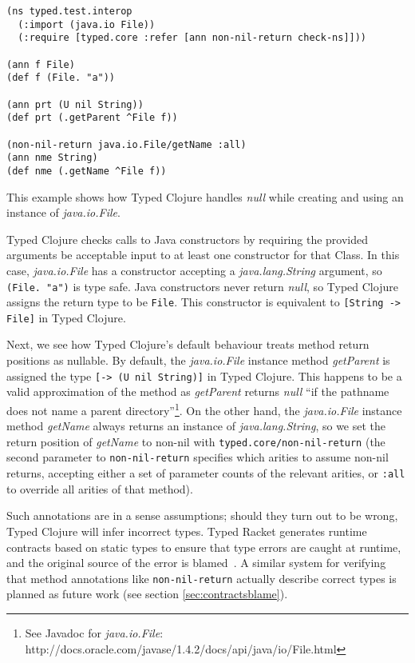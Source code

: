 \begin{lstlisting}[caption=Java interoperability with Typed Clojure]
(ns typed.test.interop
  (:import (java.io File))
  (:require [typed.core :refer [ann non-nil-return check-ns]]))

(ann f File)
(def f (File. "a"))

(ann prt (U nil String))
(def prt (.getParent ^File f))

(non-nil-return java.io.File/getName :all)
(ann nme String)
(def nme (.getName ^File f))

\end{lstlisting}

This example shows how Typed Clojure handles \emph{null} while creating and
using an instance of \emph{java.io.File}.

Typed Clojure checks calls to Java constructors by requiring the provided
arguments be acceptable input to at least one constructor for that Class.
In this case, \emph{java.io.File} has a constructor accepting a \emph{java.lang.String}
argument, so \lstinline|(File. "a")| is type safe. Java constructors never
return \emph{null}, so Typed Clojure assigns the return type to be \lstinline|File|.
This constructor is equivalent to \lstinline|[String -> File]| in Typed Clojure.

Next, we see how Typed Clojure's default behaviour treats method return positions as nullable.
By default, the \emph{java.io.File} instance method \emph{getParent}
is assigned the type \lstinline|[-> (U nil String)]| in Typed Clojure. This happens to be
a valid approximation of the method as \emph{getParent} returns \emph{null} 
``if the pathname does not name a parent directory''\footnote{See Javadoc for \emph{java.io.File}: http://docs.oracle.com/javase/1.4.2/docs/api/java/io/File.html}.
On the other hand, the \emph{java.io.File} instance method \emph{getName} always returns an
instance of \emph{java.lang.String}, so we set the return position of
\emph{getName} to non-nil with \lstinline|typed.core/non-nil-return|
(the second parameter to \lstinline|non-nil-return| specifies which arities to assume non-nil 
returns, accepting either a set of parameter counts of the relevant arities, or \lstinline|:all|
to override all arities of that method).

Such annotations are in a sense assumptions; should they turn out to be wrong, Typed Clojure
will infer incorrect types. Typed Racket generates runtime contracts based on static types to ensure
that type errors are caught at runtime, and the original source of the error is blamed~\cite{WF09}.
A similar system for verifying that method annotations like \lstinline|non-nil-return|
actually describe correct types is planned as future work
(see section \ref{sec:contractsblame}).
